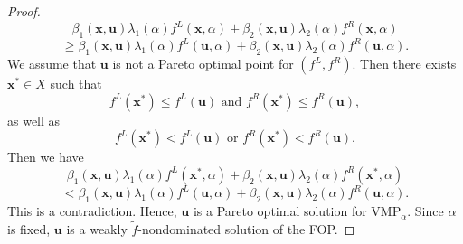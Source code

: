 \documentclass[10pt,a4paper]{amsart}
\begin{document}
\begin{proof}
$$\beta_1(\boldsymbol x, \boldsymbol u)  \lambda_1( \alpha) f^L(\boldsymbol x,  \alpha) + \beta_2(\boldsymbol x, \boldsymbol u)  \lambda_2( \alpha) f^R(\boldsymbol x,  \alpha)$$
$$\geq \beta_1(\boldsymbol x, \boldsymbol u)  \lambda_1( \alpha) f^L(\boldsymbol u,  \alpha) + \beta_2(\boldsymbol x, \boldsymbol u)  \lambda_2( \alpha) f^R(\boldsymbol u,  \alpha).$$
We assume that $\boldsymbol u$ is not a Pareto optimal point for $(f^L,f^R)$. Then there exists $\boldsymbol x^*\in X$ such that $$f^L(\boldsymbol x^*) \leq f^L(\boldsymbol u)\text{ and } f^R(\boldsymbol x^*) \leq f^R(\boldsymbol u),$$ as well as $$f^L(\boldsymbol x^*) < f^L(\boldsymbol u)\text{ or } f^R(\boldsymbol x^*) < f^R(\boldsymbol u).$$ Then we have
$$\beta_1(\boldsymbol x, \boldsymbol u)  \lambda_1( \alpha) f^L(\boldsymbol x^*,  \alpha) + \beta_2(\boldsymbol x, \boldsymbol u)  \lambda_2( \alpha) f^R(\boldsymbol x^*,  \alpha)$$
$$< \beta_1(\boldsymbol x, \boldsymbol u)  \lambda_1( \alpha) f^L(\boldsymbol u,  \alpha) + \beta_2(\boldsymbol x, \boldsymbol u)  \lambda_2( \alpha) f^R(\boldsymbol u,  \alpha).$$
This is a contradiction. Hence, $\boldsymbol u$ is a Pareto optimal solution for VMP$_{\alpha}$. Since $\alpha$ is fixed, $\boldsymbol u$ is a weakly $\tilde f$-nondominated solution of the FOP. 
\end{proof}
\end{document}
